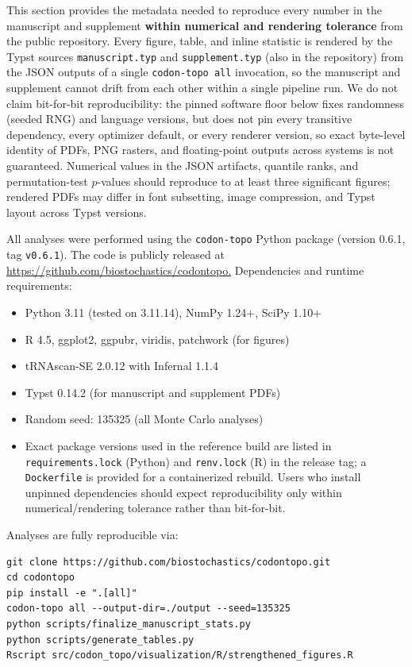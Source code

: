 \documentclass[preprint,11pt,authoryear,a4paper]{elsarticle}
\begin{document}
This section provides the metadata needed to reproduce every number in
the manuscript and supplement \textbf{within numerical and rendering
tolerance} from the public repository. Every figure, table, and inline
statistic is rendered by the Typst sources \texttt{manuscript.typ} and
\texttt{supplement.typ} (also in the repository) from the JSON outputs
of a single \texttt{codon-topo\ all} invocation, so the manuscript and
supplement cannot drift from each other within a single pipeline run. We
do not claim bit-for-bit reproducibility: the pinned software floor
below fixes randomness (seeded RNG) and language versions, but does not
pin every transitive dependency, every optimizer default, or every
renderer version, so exact byte-level identity of PDFs, PNG rasters, and
floating-point outputs across systems is not guaranteed. Numerical
values in the JSON artifacts, quantile ranks, and permutation-test
\(p\)-values should reproduce to at least three significant figures;
rendered PDFs may differ in font subsetting, image compression, and
Typst layout across Typst versions.

All analyses were performed using the \texttt{codon-topo} Python package
(version 0.6.1, tag \texttt{v0.6.1}). The code is publicly released at
\url{https://github.com/biostochastics/codontopo.} Dependencies and
runtime requirements:

\begin{itemize}
\item
  Python 3.11 (tested on 3.11.14), NumPy 1.24+, SciPy 1.10+
\item
  R 4.5, ggplot2, ggpubr, viridis, patchwork (for figures)
\item
  tRNAscan-SE 2.0.12 with Infernal 1.1.4
\item
  Typst 0.14.2 (for manuscript and supplement PDFs)
\item
  Random seed: 135325 (all Monte Carlo analyses)
\item
  Exact package versions used in the reference build are listed in
  \texttt{requirements.lock} (Python) and \texttt{renv.lock} (R) in the
  release tag; a \texttt{Dockerfile} is provided for a containerized
  rebuild. Users who install unpinned dependencies should expect
  reproducibility only within numerical/rendering tolerance rather than
  bit-for-bit.
\end{itemize}

Analyses are fully reproducible via:

\begin{verbatim}
git clone https://github.com/biostochastics/codontopo.git
cd codontopo
pip install -e ".[all]"
codon-topo all --output-dir=./output --seed=135325
python scripts/finalize_manuscript_stats.py
python scripts/generate_tables.py
Rscript src/codon_topo/visualization/R/strengthened_figures.R
\end{verbatim}
\end{document}
